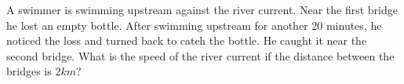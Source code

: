 A swimmer is swimming upstream against the river current. Near the first bridge he lost an empty bottle. After swimming upstream for another $20$ minutes, he noticed the loss and turned back to catch the bottle. He caught it near the second bridge. What is the speed of the river current if the distance between the bridges is $2km$?
